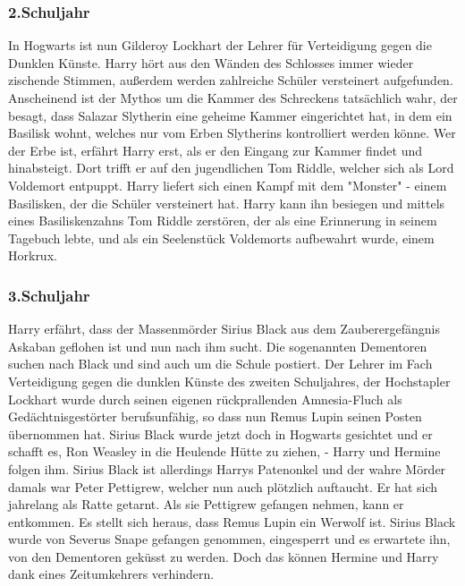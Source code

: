 \documentclass[a4paper, 10pt]{article}
\begin{document}
\subsubsection*{\large 2.Schuljahr}
In Hogwarts ist nun Gilderoy Lockhart der Lehrer für Verteidigung gegen die Dunklen Künste. Harry hört aus den Wänden des Schlosses immer wieder zischende Stimmen, außerdem werden zahlreiche Schüler versteinert aufgefunden.
\vspace{10pt}
\newline
Anscheinend ist der Mythos um die Kammer des Schreckens tatsächlich wahr, der besagt, dass Salazar Slytherin eine geheime Kammer eingerichtet hat, in dem ein Basilisk wohnt, welches nur vom Erben Slytherins kontrolliert werden könne.
\vspace{10pt}
\newline
Wer der Erbe ist, erfährt Harry erst, als er den Eingang zur Kammer findet und hinabsteigt. Dort trifft er auf den jugendlichen Tom Riddle, welcher sich als Lord Voldemort entpuppt. Harry liefert sich einen Kampf mit dem "Monster" - einem Basilisken, der die Schüler versteinert hat. Harry kann ihn besiegen und mittels eines Basiliskenzahns Tom Riddle zerstören, der als eine Erinnerung in seinem Tagebuch lebte, und als ein Seelenstück Voldemorts aufbewahrt wurde, einem Horkrux.
\subsubsection*{\large 3.Schuljahr}
Harry erfährt, dass der Massenmörder Sirius Black aus dem Zauberergefängnis Askaban geflohen ist und nun nach ihm sucht. Die sogenannten Dementoren suchen nach Black und sind auch um die Schule postiert.
\vspace{10pt}
\newline
Der Lehrer im Fach Verteidigung gegen die dunklen Künste des zweiten Schuljahres, der Hochstapler Lockhart wurde durch seinen eigenen rückprallenden Amnesia-Fluch als Gedächtnisgestörter berufsunfähig, so dass nun Remus Lupin seinen Posten übernommen hat. Sirius Black wurde jetzt doch in Hogwarts gesichtet und er schafft es, Ron Weasley in die Heulende Hütte zu ziehen, - Harry und Hermine folgen ihm.
\vspace{10pt}
\newline
Sirius Black ist allerdings Harrys Patenonkel und der wahre Mörder damals war Peter Pettigrew, welcher nun auch plötzlich auftaucht. Er hat sich jahrelang als Ratte getarnt. Als sie Pettigrew gefangen nehmen, kann er entkommen.
\vspace{10pt}
\newline
Es stellt sich heraus, dass Remus Lupin ein Werwolf ist. Sirius Black wurde von Severus Snape gefangen genommen, eingesperrt und es erwartete ihn, von den Dementoren geküsst zu werden. Doch das können Hermine und Harry dank eines Zeitumkehrers verhindern.
\end{document}
